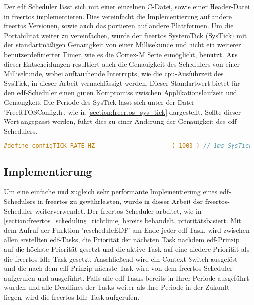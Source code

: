 \documentclass[../EDF Master Thesis.tex]{subfiles}
\begin{document}
Der \ac{edf} Scheduler lässt sich mit einer einzelnen C-Datei, sowie einer Header-Datei in \ac{freertos} implementieren.
Dies vereinfacht die Implementierung auf andere \ac{freertos} Versionen, sowie auch das portieren auf andere Plattformen.
Um die Portabilität weiter zu vereinfachen, wurde der \ac{freertos} SystemTick (SysTick) mit der standartmäßigen Genauigkeit von einer Millisekunde und nicht ein weiterer benutzerdefinierter Timer, wie es die Cortex-M Serie ermöglicht, benutzt.
Aus dieser Entscheidungen resultiert auch die Genauigkeit des Schedulers von einer Millisekunde, wobei auftauchende Interrupts, wie die \ac{cpu}-Ausführzeit des SysTick, in dieser Arbeit vernachlässigt werden.
Dieser Standartwert bietet für den \ac{edf}-Scheduler einen guten Kompromiss zwischen Applikationslaufzeit und Genauigkeit.
Die Periode des SysTick lässt sich unter der Datei 'FreeRTOSConfig.h', wie in \autoref{section:freertos_sys_tick} dargestellt.
Sollte dieser Wert angepasst werden, führt dies zu einer Änderung der Genauigkeit des \ac{edf}-Schedulers.

\begin{lstlisting}[language=C, caption=FreeRTOS Idle Task Hook, label=code:freertos_idle_task_hook]
    #define configTICK_RATE_HZ						( 1000 ) // 1ms SysTick
\end{lstlisting}

\subsection{Implementierung} \label{section:implementierung}
    Um eine einfache und zugleich sehr performante Implementierung eines \ac{edf}-Schedulers in \ac{freertos} zu gewährleisten, wurde in dieser Arbeit der \ac{freertos}-Scheduler weiterverwendet.
    Der \ac{freertos}-Scheduler arbeitet, wie in \autoref{section:freertos_scheduling_richtlinie} bereits behandelt, prioritätsbasiert.
    Mit dem Aufruf der Funktion 'rescheduleEDF' am Ende jeder \ac{edf}-Task, wird zwischen allen erstellten \ac{edf}-Tasks, die Priorität der nächsten Task nachdem \ac{edf}-Prinzip auf die höchste Priorität gesetzt und die aktive Task auf eine niedere Priorität als die \ac{freertos} Idle Task gesetzt.
    Anschließend wird ein Context Switch ausgelöst und die nach dem \ac{edf}-Prinzip nächste Task wird von dem \ac{freertos}-Scheduler aufgerufen und ausgeführt.
    Falls alle \ac{edf}-Tasks bereits in Ihrer Periode ausgeführt wurden und alle Deadlines der Tasks weiter als ihre Periode in der Zukunft liegen, wird die \ac{freertos} Idle Task aufgerufen.
\end{document}
